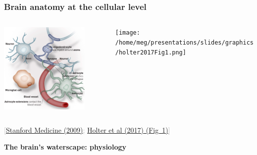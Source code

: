 \documentclass[mathserif, aspectratio=169]{beamer}
\newcommand{\refer}[1]{\begin{flushright}{\tiny \textcolor{darkgray}{[#1]}}\end{flushright}}
\newcommand{\mysection}[1]{\begin{frame} \begin{center} \vspace{3em} \textbf{#1} \end{center} \end{frame}}
\begin{document}
\begin{frame}
  \frametitle{Brain anatomy at the cellular level}
  \vspace{-2em}
  \begin{columns}[t]
      \begin{column}{0.6\textwidth}
      \begin{center}
        \includegraphics[width=0.8\textwidth]{graphics/cells_illustration.png}
      \end{center}
      \end{column}
      \begin{column}{0.4\textwidth}
      \begin{center}
        \texttt{[image: /home/meg/presentations/slides/graphics/holter2017Fig1.png]}
      \end{center}
      \end{column}
  \end{columns}
  \refer{\href{http://sm.stanford.edu/archive/stanmed/2009fall/article6.html}{Stanford Medicine (2009)};
    \href{https://doi.org/10.1073/pnas.1706942114}{Holter et al (2017) (Fig~1)}}
 \end{frame}


\mysection{The brain's waterscape: physiology}




\end{document}
